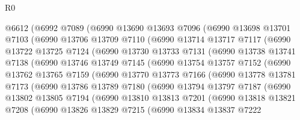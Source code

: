 \begin{lexlean}{R0}
\begin{coremodule}
    @6612
      (@6992
        @7089
        (@6990
          @13690
          @13693
          @7096
          (@6990
            @13698
            @13701
            @7103
            (@6990
              @13706
              @13709
              @7110
              (@6990
                @13714
                @13717
                @7117
                (@6990
                  @13722
                  @13725
                  @7124
                  (@6990
                    @13730
                    @13733
                    @7131
                    (@6990
                      @13738
                      @13741
                      @7138
                      (@6990
                        @13746
                        @13749
                        @7145
                        (@6990
                          @13754
                          @13757
                          @7152
                          (@6990
                            @13762
                            @13765
                            @7159
                            (@6990
                              @13770
                              @13773
                              @7166
                              (@6990
                                @13778
                                @13781
                                @7173
                                (@6990
                                  @13786
                                  @13789
                                  @7180
                                  (@6990
                                    @13794
                                    @13797
                                    @7187
                                    (@6990
                                      @13802
                                      @13805
                                      @7194
                                      (@6990
                                        @13810
                                        @13813
                                        @7201
                                        (@6990
                                          @13818
                                          @13821
                                          @7208
                                          (@6990
                                            @13826
                                            @13829
                                            @7215
                                            (@6990
                                              @13834
                                              @13837
                                              @7222

\end{coremodule}
\end{lexlean}
